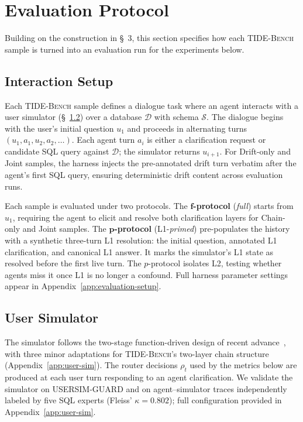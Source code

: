\section{Evaluation Protocol}

\label{sec:protocol}
Building on the construction in \S~3, this section specifies how each \textsc{TIDE-Bench} sample is turned into an evaluation run for the experiments below.


\subsection{Interaction Setup}
\label{subsec:interaction}

Each \textsc{TIDE-Bench} sample defines a dialogue task where an agent interacts with a user simulator (\S~\ref{subsec:simulator}) over a database $\mathcal{D}$ with schema $\mathcal{S}$. The dialogue begins with the user's initial question $u_1$ and proceeds in alternating turns $(u_1, a_1, u_2, a_2, \ldots)$. Each agent turn $a_i$ is either a clarification request or candidate SQL query against $\mathcal{D}$; the simulator returns $u_{i+1}$. For Drift-only and Joint samples, the harness injects the pre-annotated drift turn verbatim after the agent's first SQL query, ensuring deterministic drift content across evaluation runs.

 Each sample is evaluated under two protocols. The \textbf{\(\boldsymbol{f}\)-protocol} (\emph{full}) starts from $u_1$, requiring the agent to elicit and resolve both clarification layers for Chain-only and Joint samples. The \textbf{\(\boldsymbol{p}\)-protocol} (L1-\emph{primed}) pre-populates the history with a synthetic three-turn L1 resolution: the initial question, annotated L1 clarification, and canonical L1 answer. It marks the simulator's L1 state as resolved before the first live turn. The $p$-protocol isolates L2, testing whether agents miss it once L1 is no longer a confound. Full harness parameter settings appear in Appendix~\ref{app:evaluation-setup}.

\subsection{User Simulator}
\label{subsec:simulator}

The simulator follows the two-stage function-driven design of recent advance~\cite{huo2026interact}, with three minor adaptations for \textsc{TIDE-Bench}'s two-layer chain structure (Appendix~\ref{app:user-sim}). The router decisions $\rho_t$ used by  the metrics below are produced at each user turn responding to an agent clarification. We validate the simulator on USERSIM-GUARD and on agent--simulator traces independently labeled by five SQL experts (Fleiss' $\kappa = 0.802$); full configuration provided in Appendix~\ref{app:user-sim}.



